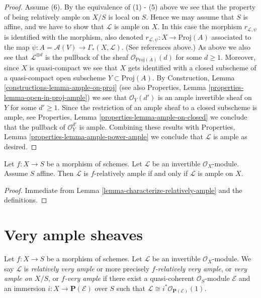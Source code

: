 \begin{proof}
\medskip\noindent
Assume (6). By the equivalence of (1) - (5) above we see that the
property of being relatively ample on $X/S$ is local on $S$. Hence
we may assume that $S$ is affine, and we have to show that
$\mathcal{L}$ is ample on $X$. In this case the morphism
$r_{\mathcal{L}, \psi}$ is identified with the morphism, also denoted
$r_{\mathcal{L}, \psi} : X \to \text{Proj}(A)$ associated to the map
$\psi : A = \mathcal{A}(V) \to \Gamma_*(X, \mathcal{L})$.
(See references above.) As above we also see that
$\mathcal{L}^{\otimes d}$ is the pullback of the sheaf
$\mathcal{O}_{\text{Proj}(A)}(d)$ for some $d \geq 1$.
Moreover, since $X$ is quasi-compact we
see that $X$ gets identified with a closed subscheme of a
quasi-compact open subscheme $Y \subset \text{Proj}(A)$.
By Construction, Lemma \ref{constructions-lemma-ample-on-proj}
(see also
Properties, Lemma \ref{properties-lemma-open-in-proj-ample})
we see that $\mathcal{O}_Y(d')$ is an ample invertible sheaf on
$Y$ for some $d' \geq 1$. Since the restriction of an ample
sheaf to a closed subscheme is ample, see
Properties, Lemma \ref{properties-lemma-ample-on-closed}
we conclude that the pullback of
$\mathcal{O}_Y^{d'}$ is ample. Combining these results with
Properties, Lemma \ref{properties-lemma-ample-power-ample}
we conclude that $\mathcal{L}$ is ample as desired.
\end{proof}

\begin{lemma}
\label{lemma-ample-over-affine}
Let $f : X \to S$ be a morphism of schemes.
Let $\mathcal{L}$ be an invertible $\mathcal{O}_X$-module.
Assume $S$ affine.
Then $\mathcal{L}$ is $f$-relatively ample if and only
if $\mathcal{L}$ is ample on $X$.
\end{lemma}

\begin{proof}
Immediate from Lemma \ref{lemma-characterize-relatively-ample}
and the definitions.
\end{proof}











\section{Very ample sheaves}
\label{section-very-ample}

\begin{definition}
\label{definition-very-ample}
Let $f : X \to S$ be a morphism of schemes.
Let $\mathcal{L}$ be an invertible $\mathcal{O}_X$-module.
We say $\mathcal{L}$ is {\it relatively very ample} or more
precisely {\it $f$-relatively very ample}, or
{\it very ample on $X/S$}, or {\it $f$-very ample} if
there exist a quasi-coherent $\mathcal{O}_S$-module
$\mathcal{E}$ and an immersion $i : X \to \mathbf{P}(\mathcal{E})$
over $S$ such that
$\mathcal{L} \cong i^*\mathcal{O}_{\mathbf{P}(\mathcal{E})}(1)$.
\end{definition}

